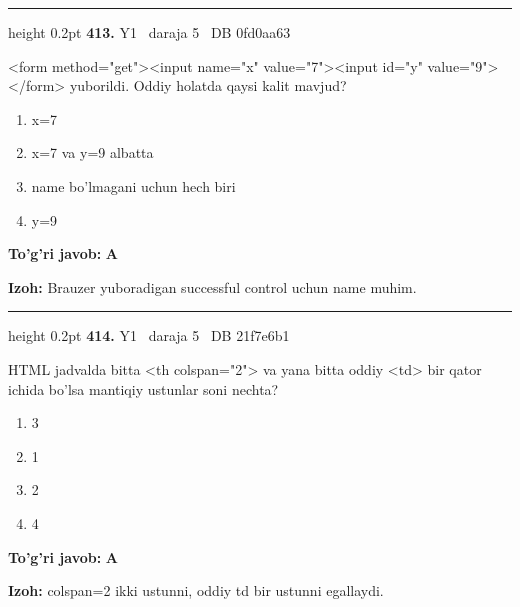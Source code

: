 \documentclass[10pt,a4paper,oneside]{article}
\begin{document}
\vspace{2mm}\hrule height 0.2pt \vspace{4mm}
\hypertarget{q413}{\textbf{\color{ink}413.}}  {\color{muted}\scriptsize Y1 \textbullet\ daraja 5 \textbullet\ DB 0fd0aa63}
\par
\textless{}form method="get"\textgreater{}\textless{}input name="x" value="7"\textgreater{}\textless{}input id="y" value="9"\textgreater{}\textless{}/form\textgreater{} yuborildi. Oddiy holatda qaysi kalit mavjud?
\begin{enumerate}[label=\Alph*),leftmargin=9mm]
\item x=7
\item x=7 va y=9 albatta
\item name bo'lmagani uchun hech biri
\item y=9
\end{enumerate}
\begin{tcolorbox}[enhanced,breakable,colback=teal!4,colframe=teal!45!black,boxrule=0.45pt,arc=1.2mm,left=2.8mm,right=2.8mm,top=2mm,bottom=2mm,before skip=2mm,after skip=2mm]
\textbf{\color{teal}To'g'ri javob:} \textbf{A}
\par\smallskip
\textbf{Izoh:} Brauzer yuboradigan successful control uchun name muhim.
\end{tcolorbox}
\vspace{2mm}\hrule height 0.2pt \vspace{4mm}
\hypertarget{q414}{\textbf{\color{ink}414.}}  {\color{muted}\scriptsize Y1 \textbullet\ daraja 5 \textbullet\ DB 21f7e6b1}
\par
HTML jadvalda bitta \textless{}th colspan="2"\textgreater{} va yana bitta oddiy \textless{}td\textgreater{} bir qator ichida bo'lsa mantiqiy ustunlar soni nechta?
\begin{enumerate}[label=\Alph*),leftmargin=9mm]
\item 3
\item 1
\item 2
\item 4
\end{enumerate}
\begin{tcolorbox}[enhanced,breakable,colback=teal!4,colframe=teal!45!black,boxrule=0.45pt,arc=1.2mm,left=2.8mm,right=2.8mm,top=2mm,bottom=2mm,before skip=2mm,after skip=2mm]
\textbf{\color{teal}To'g'ri javob:} \textbf{A}
\par\smallskip
\textbf{Izoh:} colspan=2 ikki ustunni, oddiy td bir ustunni egallaydi.
\end{tcolorbox}
\end{document}
